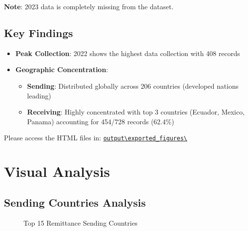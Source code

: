 \documentclass[
  11pt,
]{article}
\providecommand{\tightlist}{%
  \setlength{\itemsep}{0pt}\setlength{\parskip}{0pt}}\usepackage{longtable,booktabs,array}
\begin{document}
\textbf{Note}: 2023 data is completely missing from the dataset.

\subsection{Key Findings}\label{key-findings}

\begin{itemize}
\tightlist
\item
  \textbf{Peak Collection}: 2022 shows the highest data collection with
  408 records
\item
  \textbf{Geographic Concentration}:

  \begin{itemize}
  \tightlist
  \item
    \textbf{Sending}: Distributed globally across 206 countries
    (developed nations leading)
  \item
    \textbf{Receiving}: Highly concentrated with top 3 countries
    (Ecuador, Mexico, Panama) accounting for 454/728 records (62.4\%)
  \end{itemize}
\end{itemize}

Please access the HTML files in:
\href{https://github.com/WilliamClintC/RER/tree/main/_output/exported_figures}{\texttt{output\textbackslash{}exported\_figures\textbackslash{}}}

\section{Visual Analysis}\label{visual-analysis}

\subsection{Sending Countries
Analysis}\label{sending-countries-analysis-1}

\begin{figure}[H]


\caption{\label{fig-sending-static}Top 15 Remittance Sending Countries}

\end{figure}%
\end{document}
